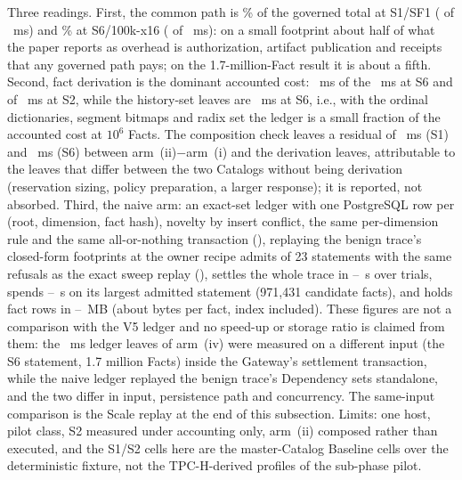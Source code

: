 \documentclass[journal,onecolumn]{IEEEtran}
\begin{document}
Three readings. First, the common path is \BFiveSOneCommonPct\% of the
governed total at S1/SF1 (\BFiveSOneArmI{} of \BFiveSOneArmIV{}~ms) and
\BFiveSSixCommonPct\% at S6/100k-x16 (\BFiveSSixArmI{} of
\BFiveSSixArmIV{}~ms): on a small footprint about half of what the paper
reports as overhead is authorization, artifact publication and receipts that
any governed path pays; on the 1.7-million-Fact result it is about a fifth.
Second, fact derivation is the dominant accounted cost: \BFiveSSixDerivation{}~ms
of the \BFiveSSixArmIV{}~ms at S6 and \BFiveSTwoDerivation{} of
\BFiveSTwoArmIV{}~ms at S2, while the history-set leaves are
\BFiveSSixLedger{}~ms at S6, i.e., with the ordinal dictionaries, segment
bitmaps and radix set the ledger is a small fraction of the accounted cost
at $10^6$ Facts. The composition check leaves a residual of
\BFiveSOneIminusIvsDeriv{}~ms (S1) and \BFiveSSixIminusIvsDeriv{}~ms (S6)
between arm~(ii)$-$arm~(i) and the derivation leaves, attributable to the
leaves that differ between the two Catalogs without being derivation
(reservation sizing, policy preparation, a larger response); it is reported,
not absorbed. Third, the naive arm: an exact-set ledger with one PostgreSQL
row per (root, dimension, fact hash), novelty by insert conflict, the same
per-dimension rule and the same all-or-nothing transaction
(), replaying the benign trace's
closed-form footprints at the owner recipe admits \NaiveAdmitted{} of 23
statements with the same refusals as the exact sweep replay
(\NaiveSweepCrossCheck{}), settles the whole trace in
\NaiveTotalSettleSecMin{}--\NaiveTotalSettleSecMax{}~s over \NaiveTrials{}
trials, spends \NaiveLargestInsertSecMin{}--\NaiveLargestInsertSecMax{}~s on
its largest admitted statement (971,431 candidate facts), and holds
\NaiveFactRows{} fact rows in \NaiveTotalMBMin{}--\NaiveTotalMBMax{}~MB
(about \NaiveBytesPerFact{} bytes per fact, index included). These figures
are not a comparison with the V5 ledger and no speed-up or storage ratio is
claimed from them: the \BFiveSSixLedger{}~ms ledger leaves of arm~(iv) were
measured on a different input (the S6 statement, 1.7 million Facts) inside
the Gateway's settlement transaction, while the naive ledger replayed the
benign trace's Dependency sets standalone, and the two differ in input,
persistence path and concurrency. The same-input comparison is the Scale
replay at the end of this subsection. Limits: one host, pilot class, S2 measured under accounting only,
arm~(ii) composed rather than executed, and the S1/S2 cells here are the
master-Catalog Baseline cells over the deterministic fixture, not the
TPC-H-derived profiles of the sub-phase pilot.
\end{document}
